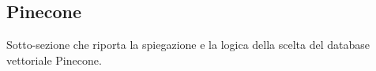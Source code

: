 \subsection{Pinecone}

Sotto-sezione che riporta la spiegazione e la logica della scelta del database vettoriale Pinecone.